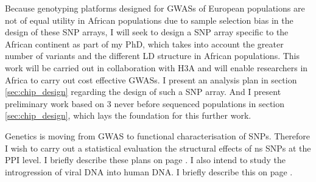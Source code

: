 Because genotyping platforms designed for \glspl{GWAS} of European populations are not of equal utility in African populations due to sample selection bias in the design of these \gls{SNP} arrays, I will seek to design a \gls{SNP} array specific to the African continent as part of my PhD, which takes into account the greater number of variants and the different \gls{LD} structure in African populations.
This work will be carried out in collaboration with \acrfull{H3A} and will enable researchers in Africa to carry out cost effective \glspl{GWAS}. I present an analysis plan in section \ref{sec:chip_design} regarding the design of such a \gls{SNP} array. And I present preliminary work based on 3 never before sequenced populations in section \ref{sec:chip_design}, which lays the foundation for this further work.

Genetics is moving from \gls{GWAS} to functional characterisation of \glspl{SNP}. Therefore I wish to carry out a statistical evaluation the structural effects of \gls{ns} \glspl{SNP} at the \gls{PPI} level. I briefly describe these plans on page \pageref{chap:future}. I also intend to study the introgression of viral DNA into human DNA. I briefly describe this on page \pageref{chap:future}.




